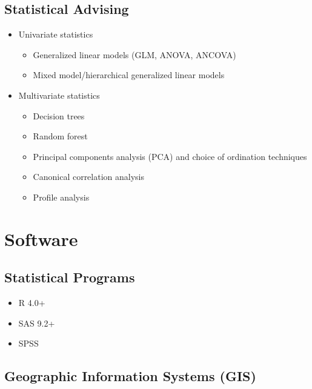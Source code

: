 \documentclass[
  letterpaper,
  DIV=11,
  numbers=noendperiod,
  oneside]{scrreprt}
\providecommand{\tightlist}{%
  \setlength{\itemsep}{0pt}\setlength{\parskip}{0pt}}\usepackage{longtable,booktabs,array}
\begin{document}
\subsection{Statistical Advising}\label{statistical-advising}

\begin{itemize}
\tightlist
\item
  Univariate statistics

  \begin{itemize}
  \tightlist
  \item
    Generalized linear models (GLM, ANOVA, ANCOVA)
  \item
    Mixed model/hierarchical generalized linear models
  \end{itemize}
\item
  Multivariate statistics

  \begin{itemize}
  \tightlist
  \item
    Decision trees
  \item
    Random forest
  \item
    Principal components analysis (PCA) and choice of ordination
    techniques
  \item
    Canonical correlation analysis
  \item
    Profile analysis
  \end{itemize}
\end{itemize}

\section{Software}\label{software}

\subsection{Statistical Programs}\label{statistical-programs}

\begin{itemize}
\tightlist
\item
  R 4.0+
\item
  SAS 9.2+
\item
  SPSS
\end{itemize}

\subsection{Geographic Information Systems
(GIS)}\label{geographic-information-systems-gis}
\end{document}
